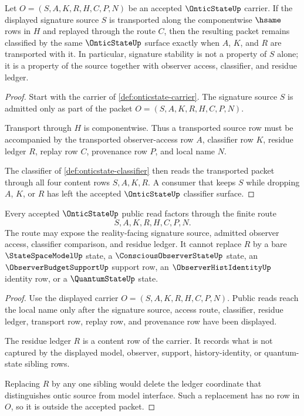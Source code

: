 \begin{theorem}
\label{thm:onticstate-signature-stability}
Let $O=(S,A,K,R,H,C,P,N)$ be an accepted $\OnticStateUp$ carrier. If the displayed signature source $S$ is transported along the componentwise $\hsame$ rows in $H$ and replayed through the route $C$, then the resulting packet remains classified by the same $\OnticStateUp$ surface exactly when $A$, $K$, and $R$ are transported with it. In particular, signature stability is not a property of $S$ alone; it is a property of the source together with observer access, classifier, and residue ledger.
\end{theorem}
\begin{proof}
Start with the carrier of \autoref{def:onticstate-carrier}. The signature source $S$ is admitted only as part of the packet $O=(S,A,K,R,H,C,P,N)$.

Transport through $H$ is componentwise. Thus a transported source row must be accompanied by the transported observer-access row $A$, classifier row $K$, residue ledger $R$, replay row $C$, provenance row $P$, and local name $N$.

The classifier of \autoref{def:onticstate-classifier} then reads the transported packet through all four content rows $S,A,K,R$. A consumer that keeps $S$ while dropping $A$, $K$, or $R$ has left the accepted $\OnticStateUp$ classifier surface.
\end{proof}

\begin{theorem}
\label{thm:onticstate-residue-ledger-exactness}
Every accepted $\OnticStateUp$ public read factors through the finite route
$$
S,A,K,R,H,C,P,N.
$$
The route may expose the reality-facing signature source, admitted observer access, classifier comparison, and residue ledger. It cannot replace $R$ by a bare $\StateSpaceModelUp$ state, a $\ConsciousObserverStateUp$ state, an $\ObserverBudgetSupportUp$ support row, an $\ObserverHistIdentityUp$ identity row, or a $\QuantumStateUp$ state.
\end{theorem}
\begin{proof}
Use the displayed carrier $O=(S,A,K,R,H,C,P,N)$. Public reads reach the local name only after the signature source, access route, classifier, residue ledger, transport row, replay row, and provenance row have been displayed.

The residue ledger $R$ is a content row of the carrier. It records what is not captured by the displayed model, observer, support, history-identity, or quantum-state sibling rows.

Replacing $R$ by any one sibling would delete the ledger coordinate that distinguishes ontic source from model interface. Such a replacement has no row in $O$, so it is outside the accepted packet.
\end{proof}

